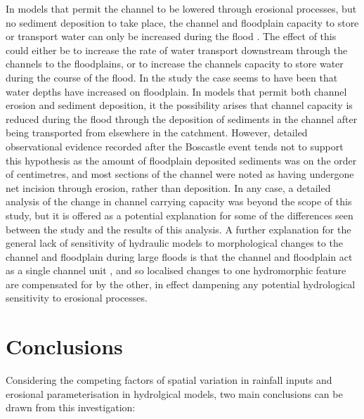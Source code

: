 In models that permit the channel to be lowered through erosional processes, but no sediment deposition to take place, the channel and floodplain capacity to store or transport water can only be increased during the flood \citep[e.g.][]{wong2015sensitivity}. The effect of this could either be to increase the rate of water transport downstream through the channels to the floodplains, or to increase the channels capacity to store water during the course of the flood. In the \citet{wong2015sensitivity} study the case seems to have been that water depths have increased on floodplain. In models that permit both channel erosion and sediment deposition, it the possibility arises that channel capacity is reduced during the flood through the deposition of sediments in the channel after being transported from elsewhere in the catchment. However, detailed observational evidence recorded after the Boscastle event tends not to support this hypothesis as the amount of floodplain deposited sediments was on the order of centimetres, and most sections of the channel were noted as having undergone net incision through erosion, rather than deposition. In any case, a detailed analysis of the change in channel carrying capacity was beyond the scope of this study, but it is offered as a potential explanation for some of the differences seen between the \citet{wong2015sensitivity} study and the results of this analysis. A further explanation for the general lack of sensitivity of hydraulic models to morphological changes to the channel and floodplain during large floods is that the channel and floodplain act as a single channel unit \citep{bates2005numerical}, and so localised changes to one hydromorphic feature are compensated for by the other, in effect dampening any potential hydrological sensitivity to erosional processes.


\section{Conclusions}  %
Considering the competing factors of spatial variation in rainfall inputs and erosional parameterisation in hydrolgical models, two main conclusions can be drawn from this investigation:

